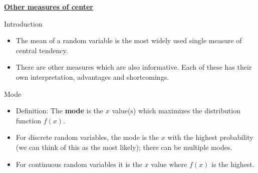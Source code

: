 \documentclass{article}
\newcommand{\bu}[1]{\textbf{\ul{#1}}}				%
\begin{document}
\bu{Other measures of center}\bigskip

Introduction\bigskip
\begin{itemize}
    \item The mean of a random variable is the most widely used single measure of central tendency.
    \item[] There are other measures which are also informative. Each of these has their own interpretation, advantages and shortcomings.
\end{itemize}\bigskip

Mode\bigskip
\begin{itemize}
    \item Definition: The \textbf{mode} is the $x$ value(s) which maximizes the distribution function $f(x)$.\bigskip
    \item[] For discrete random variables, the mode is the $x$ with the highest probability (we can think of this as the most likely); there can be multiple modes.
    \item[] For continuous random variables it is the $x$ value where $f(x)$ is the highest.\bigskip
\end{itemize}\vspace{30pt}
\end{document}

